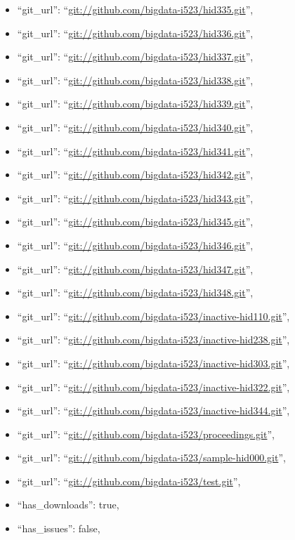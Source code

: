 \begin{itemize}
\item
  ``git\_url'': ``\url{git://github.com/bigdata-i523/hid335.git}'',
\item
  ``git\_url'': ``\url{git://github.com/bigdata-i523/hid336.git}'',
\item
  ``git\_url'': ``\url{git://github.com/bigdata-i523/hid337.git}'',
\item
  ``git\_url'': ``\url{git://github.com/bigdata-i523/hid338.git}'',
\item
  ``git\_url'': ``\url{git://github.com/bigdata-i523/hid339.git}'',
\item
  ``git\_url'': ``\url{git://github.com/bigdata-i523/hid340.git}'',
\item
  ``git\_url'': ``\url{git://github.com/bigdata-i523/hid341.git}'',
\item
  ``git\_url'': ``\url{git://github.com/bigdata-i523/hid342.git}'',
\item
  ``git\_url'': ``\url{git://github.com/bigdata-i523/hid343.git}'',
\item
  ``git\_url'': ``\url{git://github.com/bigdata-i523/hid345.git}'',
\item
  ``git\_url'': ``\url{git://github.com/bigdata-i523/hid346.git}'',
\item
  ``git\_url'': ``\url{git://github.com/bigdata-i523/hid347.git}'',
\item
  ``git\_url'': ``\url{git://github.com/bigdata-i523/hid348.git}'',
\item
  ``git\_url'':
  ``\url{git://github.com/bigdata-i523/inactive-hid110.git}'',
\item
  ``git\_url'':
  ``\url{git://github.com/bigdata-i523/inactive-hid238.git}'',
\item
  ``git\_url'':
  ``\url{git://github.com/bigdata-i523/inactive-hid303.git}'',
\item
  ``git\_url'':
  ``\url{git://github.com/bigdata-i523/inactive-hid322.git}'',
\item
  ``git\_url'':
  ``\url{git://github.com/bigdata-i523/inactive-hid344.git}'',
\item
  ``git\_url'': ``\url{git://github.com/bigdata-i523/proceedings.git}'',
\item
  ``git\_url'':
  ``\url{git://github.com/bigdata-i523/sample-hid000.git}'',
\item
  ``git\_url'': ``\url{git://github.com/bigdata-i523/test.git}'',
\item
  ``has\_downloads'': true,
\item
  ``has\_issues'': false,

\end{itemize}
